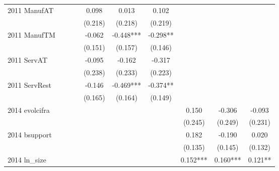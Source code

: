 \begin{table}[htbp]
\begin{tabular}{l*{9}{c}}
2011 ManufAT        &               &               &               &       0.098   &       0.013   &       0.102   &               &               &               \\
                    &               &               &               &     (0.218)   &     (0.218)   &     (0.219)   &               &               &               \\
2011 ManufTM        &               &               &               &      -0.062   &      -0.448***&      -0.298** &               &               &               \\
                    &               &               &               &     (0.151)   &     (0.157)   &     (0.146)   &               &               &               \\
2011 ServAT         &               &               &               &      -0.095   &      -0.162   &      -0.317   &               &               &               \\
                    &               &               &               &     (0.238)   &     (0.233)   &     (0.223)   &               &               &               \\
2011 ServRest       &               &               &               &      -0.146   &      -0.469***&      -0.374** &               &               &               \\
                    &               &               &               &     (0.165)   &     (0.164)   &     (0.149)   &               &               &               \\
2014 evolcifra      &               &               &               &               &               &               &       0.150   &      -0.306   &      -0.093   \\
                    &               &               &               &               &               &               &     (0.245)   &     (0.249)   &     (0.231)   \\
2014 bsupport       &               &               &               &               &               &               &       0.182   &      -0.190   &       0.020   \\
                    &               &               &               &               &               &               &     (0.135)   &     (0.145)   &     (0.132)   \\
2014 ln\_size        &               &               &               &               &               &               &       0.152***&       0.160***&       0.121** \\

\end{tabular}
\end{table}
